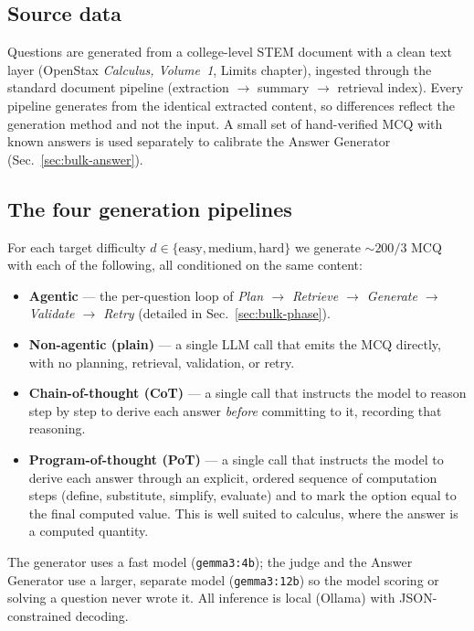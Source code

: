 \subsection{Source data}
\label{sec:bulk-data}

Questions are generated from a college-level STEM document with a clean text
layer (OpenStax \emph{Calculus, Volume~1}, Limits chapter), ingested through the
standard document pipeline (extraction $\rightarrow$ summary $\rightarrow$
retrieval index). Every pipeline generates from the identical extracted content,
so differences reflect the generation method and not the input. A small set of
hand-verified MCQ with known answers is used separately to calibrate the Answer
Generator (Sec.~\ref{sec:bulk-answer}).

\subsection{The four generation pipelines}
\label{sec:bulk-pipelines}

For each target difficulty $d\in\{\text{easy},\text{medium},\text{hard}\}$ we
generate $\sim\!200/3$ MCQ with each of the following, all conditioned on the
same content:

\begin{itemize}
  \item \textbf{Agentic} --- the per-question loop of \emph{Plan $\rightarrow$
        Retrieve $\rightarrow$ Generate $\rightarrow$ Validate $\rightarrow$ Retry}
        (detailed in Sec.~\ref{sec:bulk-phase}).
  \item \textbf{Non-agentic (plain)} --- a single LLM call that emits the MCQ
        directly, with no planning, retrieval, validation, or retry.
  \item \textbf{Chain-of-thought (CoT)} --- a single call that instructs the model
        to reason step by step to derive each answer \emph{before} committing to
        it, recording that reasoning.
  \item \textbf{Program-of-thought (PoT)} --- a single call that instructs the
        model to derive each answer through an explicit, ordered sequence of
        computation steps (define, substitute, simplify, evaluate) and to mark the
        option equal to the final computed value. This is well suited to calculus,
        where the answer is a computed quantity.
\end{itemize}

The generator uses a fast model (\texttt{gemma3:4b}); the judge and the Answer
Generator use a larger, separate model (\texttt{gemma3:12b}) so the model scoring
or solving a question never wrote it. All inference is local (Ollama) with
JSON-constrained decoding.

